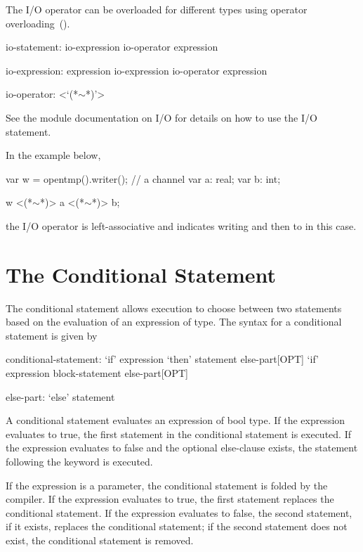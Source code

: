 The I/O operator can be overloaded for different types using operator
overloading~().
\begin{syntax}
io-statement:
  io-expression io-operator expression

io-expression:
  expression
  io-expression io-operator expression

io-operator:
  <`(*$\sim$*)'>
\end{syntax}

See the module documentation on I/O for details on how to use the
I/O statement.

\begin{example}
In the example below,
\begin{chapel}
var w = opentmp().writer(); // a channel
var a: real;
var b: int;

w <(*$\sim$*)> a <(*$\sim$*)> b;
\end{chapel}
the I/O operator is left-associative and indicates writing 
and then  to  in this case.
\end{example}


\section{The Conditional Statement}
\label{The_Conditional_Statement}

The conditional statement allows execution to choose between two
statements based on the evaluation of an expression of 
type. The syntax for a conditional statement is given by
\begin{syntax}
conditional-statement:
  `if' expression `then' statement else-part[OPT]
  `if' expression block-statement else-part[OPT]

else-part:
  `else' statement
\end{syntax}

A conditional statement evaluates an expression of bool type. If the
expression evaluates to true, the first statement in the conditional
statement is executed.  If the expression evaluates to false and the
optional else-clause exists, the statement following the
 keyword is executed.

If the expression is a parameter, the conditional statement is folded
by the compiler. If the expression evaluates to true, the first
statement replaces the conditional statement. If the expression
evaluates to false, the second statement, if it exists, replaces the
conditional statement; if the second statement does not exist, the
conditional statement is removed.


